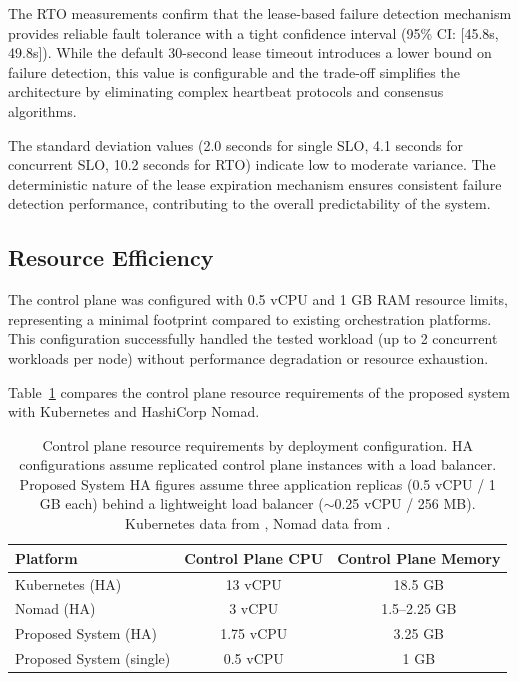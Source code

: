 The RTO measurements confirm that the lease-based failure detection mechanism provides reliable fault tolerance with a tight confidence interval (95\% CI: [45.8s, 49.8s]). While the default 30-second lease timeout introduces a lower bound on failure detection, this value is configurable and the trade-off simplifies the architecture by eliminating complex heartbeat protocols and consensus algorithms.

The standard deviation values (2.0 seconds for single SLO, 4.1 seconds for concurrent SLO, 10.2 seconds for RTO) indicate low to moderate variance. The deterministic nature of the lease expiration mechanism ensures consistent failure detection performance, contributing to the overall predictability of the system.

\subsection{Resource Efficiency}

The control plane was configured with 0.5 vCPU and 1 GB RAM resource limits, representing a minimal footprint compared to existing orchestration platforms. This configuration successfully handled the tested workload (up to 2 concurrent workloads per node) without performance degradation or resource exhaustion.

Table~\ref{tab:resource-comparison} compares the control plane resource requirements of the proposed system with Kubernetes and HashiCorp Nomad.

\begin{table}[h]
\centering
\caption{Control plane resource requirements by deployment configuration. HA configurations assume replicated control plane instances with a load balancer. Proposed System HA figures assume three application replicas (0.5 vCPU / 1 GB each) behind a lightweight load balancer ($\sim$0.25 vCPU / 256 MB). Kubernetes data from \cite{k8s_docs}, Nomad data from \cite{nomad_docs}.}
\label{tab:resource-comparison}
\begin{tabular}{lcc}
\toprule
Platform & Control Plane CPU & Control Plane Memory \\
\midrule
Kubernetes (HA) & 13 vCPU & 18.5 GB \\
Nomad (HA) & 3 vCPU & 1.5--2.25 GB \\
Proposed System (HA) & 1.75 vCPU & 3.25 GB \\
Proposed System (single) & 0.5 vCPU & 1 GB \\
\bottomrule
\end{tabular}
\end{table}

